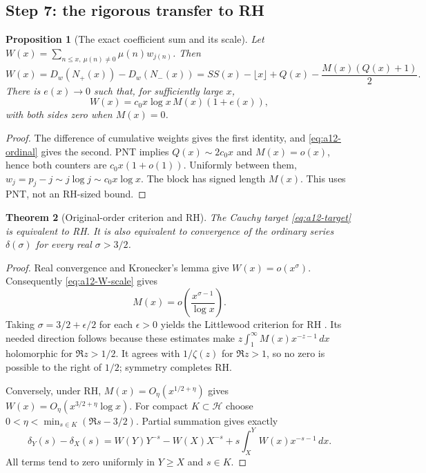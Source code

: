 \documentclass[11pt]{amsart}
\numberwithin{equation}{section}
\theoremstyle{plain}
\newtheorem{theorem}{Theorem}[section]
\newtheorem{proposition}[theorem]{Proposition}
\theoremstyle{definition}
\theoremstyle{remark}
\begin{document}
\subsection{Step 7: the rigorous transfer to RH}
\label{subsec:a12-transfer}
\begin{proposition}[The exact coefficient sum and its scale]
\label{prop:a12-W-scale}
Let $W(x)=\sum_{n\le x,\ \mu(n)\ne0}\mu(n)w_{j(n)}$. Then
\begin{equation}
\label{eq:a12-W}
W(x)=D_w(N_+(x))-D_w(N_-(x))
=SS(x)-\lfloor x\rfloor+Q(x)-\frac{M(x)(Q(x)+1)}2.
\end{equation}
There is $e(x)\to0$ such that, for sufficiently large $x$,
\begin{equation}
\label{eq:a12-W-scale}
W(x)=c_0x\log x\,M(x)(1+e(x)),
\end{equation}
with both sides zero when $M(x)=0$.
\end{proposition}
\begin{proof}
The difference of cumulative weights gives the first identity, and
\eqref{eq:a12-ordinal} gives the second. PNT implies $Q(x)\sim2c_0x$ and
$M(x)=o(x)$, hence both counters are $c_0x(1+o(1))$.
Uniformly between them, $w_j=p_j-j\sim j\log j\sim c_0x\log x$.
The block has signed length $M(x)$. This uses PNT, not an RH-sized bound.
\end{proof}

\begin{theorem}[Original-order criterion and RH]
\label{thm:a12-transfer}
The Cauchy target \eqref{eq:a12-target} is equivalent to RH.
It is also equivalent to convergence of the ordinary series $\delta(\sigma)$
for every real $\sigma>3/2$.
\end{theorem}
\begin{proof}
Real convergence and Kronecker's lemma give $W(x)=o(x^\sigma)$.
Consequently \eqref{eq:a12-W-scale} gives
\begin{equation}
\label{eq:a12-Kronecker}
M(x)=o\left(\frac{x^{\sigma-1}}{\log x}\right).
\end{equation}
Taking $\sigma=3/2+\epsilon/2$ for each $\epsilon>0$ yields the
Littlewood criterion for RH \cite{Littlewood1912,Titchmarsh1986}.
Its needed direction follows because these estimates make
$z\int_1^\infty M(x)x^{-z-1}\,dx$ holomorphic for $\Re z>1/2$.
It agrees with $1/\zeta(z)$ for $\Re z>1$, so no zero is possible to
the right of $1/2$; symmetry completes RH.

Conversely, under RH, $M(x)=O_\eta(x^{1/2+\eta})$ gives
$W(x)=O_\eta(x^{3/2+\eta}\log x)$.
For compact $K\subset\mathcal H$ choose
$0<\eta<\min_{s\in K}(\Re s-3/2)$. Partial summation gives exactly
\begin{equation}
\label{eq:a12-Abel-tail}
\delta_Y(s)-\delta_X(s)
=W(Y)Y^{-s}-W(X)X^{-s}
+s\int_X^Y W(x)x^{-s-1}\,dx.
\end{equation}
All terms tend to zero uniformly in $Y\ge X$ and $s\in K$.
\end{proof}
\end{document}
